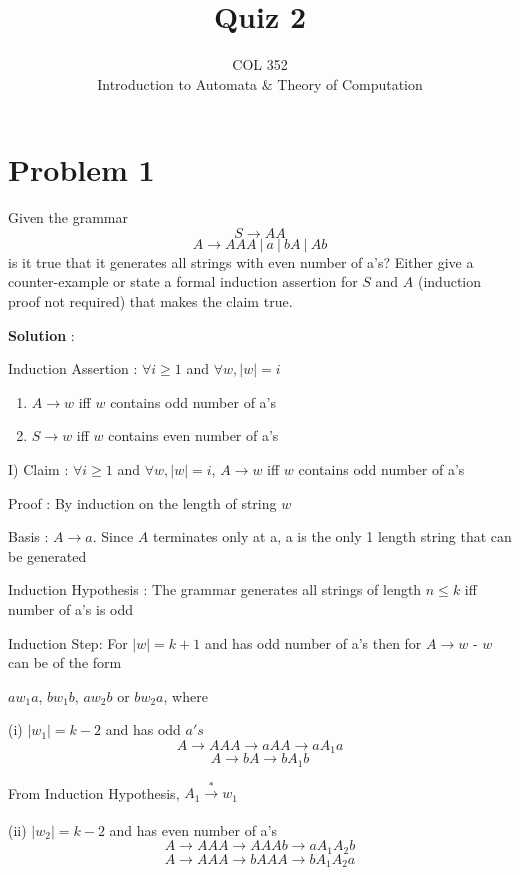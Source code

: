 \documentclass{article}
\title{Quiz 2}
\author{COL 352\\
    Introduction to Automata \& 
    Theory of Computation}
\date{}
\begin{document}
    \maketitle
    
    \section*{Problem 1} Given the grammar 
    $$S \rightarrow AA$$
    $$A \rightarrow AAA~|~a~|~bA~|~Ab$$
    is it true that it generates all strings with even number of a's? Either give a counter-example or state a formal induction assertion for $S$ and $A$ (induction proof not required) that makes the claim true.
    
    \textbf{Solution} :
    
    Induction Assertion : $\forall i \geq 1$ and $\forall w, |w| = i$
    \begin{enumerate}
        \item $A \rightarrow w$ iff $w$ contains odd number of a's
        \item $S \rightarrow w$ iff $w$ contains even number of a's
    \end{enumerate}

    I) Claim : $\forall i \geq 1$ and $\forall w, |w| = i$, $A \rightarrow w$ iff $w$ contains odd number of a's
    
    \quad Proof : By induction on the length of string $w$
    
    \quad Basis :   $A \rightarrow a $. Since $A$ terminates only at a, a is the only 1 length string that can be generated
    
    \quad Induction Hypothesis : The grammar generates all strings of length $n \le k$ iff number of a's is odd
    
    \quad Induction Step: For $|w| = k+1$ and has odd number of a's then for $A \rightarrow w$ - $w$ can be of the form 
    
    \quad $aw_{1}a$, $bw_{1}b$, $aw_{2}b$ or $bw_{2}a$, where
    
    \qquad (i) $|w_{1}| = k-2$ and has odd $a's$
    $$A \rightarrow AAA \rightarrow aAA \rightarrow aA_{1}a$$
    $$A \rightarrow bA \rightarrow bA_{1}b$$
    
    \qquad From Induction Hypothesis, $A_{1} \xrightarrow[]{*} w_{1}$
    
    
    \qquad (ii) $|w_{2}| = k-2$ and has even number of a's
    $$A \rightarrow AAA \rightarrow AAAb \rightarrow aA_{1}A_{2}b$$
    $$A \rightarrow AAA \rightarrow bAAA \rightarrow bA_{1}A_{2}a$$
    
\end{document}

